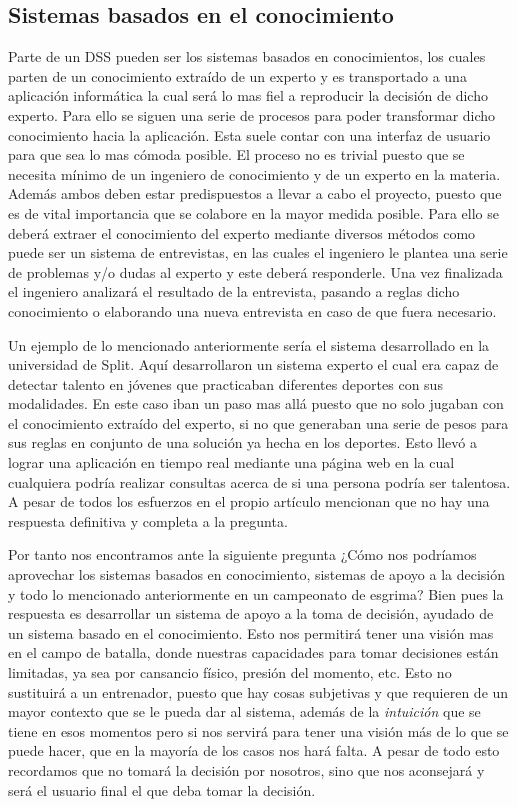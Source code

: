 \subsection{Sistemas basados en el conocimiento}

Parte de un DSS pueden ser los sistemas basados en conocimientos, los cuales parten de un conocimiento extraído de un
 experto y es transportado a una aplicación informática la cual será lo mas fiel a reproducir
 la decisión de dicho experto. Para ello se siguen una serie de procesos para poder transformar
 dicho conocimiento hacia la aplicación. Esta suele contar con una interfaz de usuario para que
 sea lo mas cómoda posible. El proceso no es trivial puesto que se necesita mínimo
 de un ingeniero de conocimiento y de un experto en la materia. Además ambos deben estar predispuestos
 a llevar a cabo el proyecto, puesto que es de vital importancia que se colabore en la mayor
 medida posible. Para ello se deberá extraer el conocimiento del experto mediante diversos métodos
 como puede ser un sistema de entrevistas, en las cuales el ingeniero le plantea una serie
 de problemas y/o dudas al experto y este deberá responderle. Una vez finalizada el ingeniero
 analizará el resultado de la entrevista, pasando a reglas dicho conocimiento o elaborando
 una nueva entrevista en caso de que fuera necesario.

Un ejemplo de lo mencionado anteriormente sería el sistema desarrollado en la universidad de Split.
 Aquí desarrollaron un sistema experto el cual era capaz de detectar talento en jóvenes que
 practicaban diferentes deportes con sus modalidades. En este caso iban un paso mas allá puesto
 que no solo jugaban con el conocimiento extraído del experto, si no que generaban una serie de
 pesos para sus reglas en conjunto de una solución ya hecha en los deportes. Esto llevó a lograr
 una aplicación en tiempo real mediante una página web en la cual cualquiera podría realizar consultas
 acerca de si una persona podría ser talentosa. A pesar de todos los esfuerzos en el propio artículo
 mencionan que no hay una respuesta definitiva y completa a la pregunta.

Por tanto nos encontramos ante la siguiente pregunta ¿Cómo nos podríamos aprovechar los
 sistemas basados en conocimiento, sistemas de apoyo a la decisión y todo lo mencionado
 anteriormente en un campeonato de esgrima? Bien pues la respuesta es desarrollar un sistema de apoyo
 a la toma de decisión, ayudado de un sistema basado en el conocimiento. Esto nos permitirá tener una
 visión mas en el campo de batalla, donde
 nuestras capacidades para tomar decisiones están limitadas, ya sea por cansancio físico, presión del
 momento, etc. Esto no sustituirá a un entrenador, puesto que hay cosas subjetivas y que requieren
 de un mayor contexto que se le pueda dar al sistema, además de la \textit{intuición} que se tiene en esos momentos
 pero si nos servirá para tener una visión más de lo que se puede hacer, que en la mayoría de los
 casos nos hará falta. A pesar de todo esto recordamos que no tomará la decisión por nosotros,
 sino que nos aconsejará y será el usuario final el que deba tomar la decisión.

